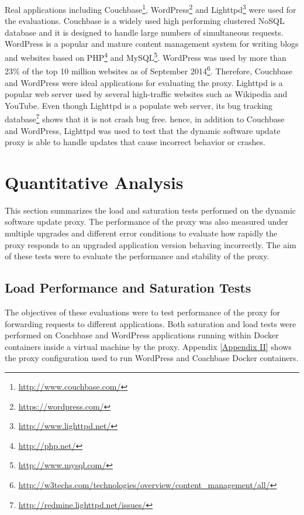 \documentclass[a4paper,11pt,twoside]{report}
\begin{document}
Real applications including Couchbase\footnote{\label{couchbase} \url{http://www.couchbase.com/}}, WordPress\footnote{\label{wordpress} \url{https://wordpress.com/}} and Lighttpd\footnote{\label{lighttpd}\url{http://www.lighttpd.net/}} were used for the evaluations. Couchbase is a widely used high performing clustered NoSQL database and it is designed to handle large numbers of  simultaneous requests. WordPress is a popular and mature content management system for writing blogs and websites based on PHP\footnote{\label{PHP}\url{http://php.net/}} and MySQL\footnote{\label{MySQL}\url{http://www.mysql.com/}}. WordPress was used by more than 23\% of the top 10 million websites as of September 2014\footnote{\label{w3techs}\url{http://w3techs.com/technologies/overview/content_management/all/}}. Therefore, Couchbase and WordPress were ideal applications for evaluating the proxy. Lighttpd is a popular web server used by several high-traffic websites such as Wikipedia and YouTube. Even though Lighttpd is a populate web server, its bug tracking database\footnote{\label{redmine}\url{http://redmine.lighttpd.net/issues/}} shows that it is not crash bug free. hence, in addition to Couchbase and WordPress,  Lighttpd was used to test that the dynamic software update proxy is able to handle updates that cause incorrect behavior or crashes.     

\section{Quantitative Analysis}
This section summarizes the load and saturation tests performed on the dynamic software update proxy. The performance of the proxy was also measured under multiple upgrades and different error conditions to evaluate how rapidly the proxy responds to an upgraded application version behaving incorrectly. The aim of these tests were to evaluate the performance and stability of the proxy.

\subsection{Load Performance and Saturation Tests}\label{load} 
The objectives of these evaluations were to test performance of the proxy for forwarding requests to different applications. Both saturation and load tests were performed on Coachbase and WordPress applications running within Docker containers inside a virtual machine by the proxy. Appendix \ref{Appendix II} shows the proxy configuration used to run WordPress and Coachbase Docker containers.\medskip
\end{document}
